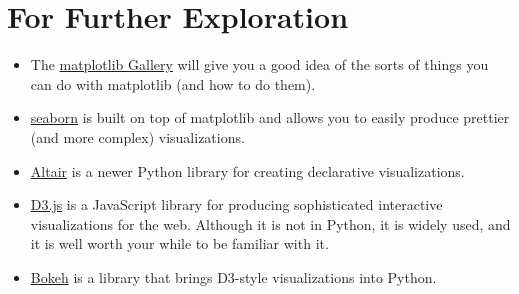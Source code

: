 \section{For Further Exploration}
\begin{itemize}
    \item The \href{https://matplotlib.org/stable/}{matplotlib Gallery} will give you a good idea of the sorts of
          things you can do with matplotlib (and how to do them).
    \item \href{https://seaborn.pydata.org/}{seaborn} is built on top of matplotlib and allows you to easily
          produce prettier (and more complex) visualizations.
    \item \href{https://altair-viz.github.io/}{Altair} is a newer Python library for creating declarative
          visualizations.
    \item \href{https://d3js.org/}{D3.js} is a JavaScript library for producing sophisticated interactive
          visualizations for the web. Although it is not in Python, it is widely
          used, and it is well worth your while to be familiar with it.
    \item \href{https://docs.bokeh.org/en/latest/}{Bokeh} is a library that brings D3-style visualizations into Python.
\end{itemize}




